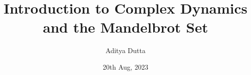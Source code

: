 \documentclass[a4paper,12pt,openany]{scrbook}
\author{Aditya Dutta}
\title{Introduction to Complex Dynamics and the Mandelbrot Set}
\date{20th Aug, 2023}
\theoremstyle{plain}
\theoremstyle{remark}
\begin{document}







\medskip

\nocite{*}
\printbibliography
\end{document}
